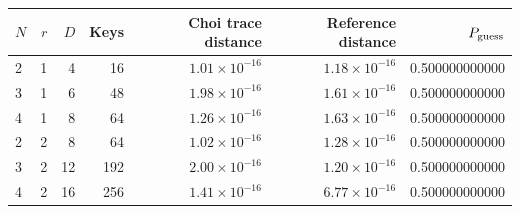 \begin{center}
{\footnotesize
\setlength{\tabcolsep}{4pt}
\begin{tabular}{@{}lrrrrrr@{}}
\toprule
$N$ & $r$ & $D$ & Keys & Choi trace distance & Reference distance & $P_{\rm guess}$ \\
\midrule
2 & 1 & 4 & 16 & $1.01\times10^{-16}$ & $1.18\times10^{-16}$ & 0.500000000000 \\
3 & 1 & 6 & 48 & $1.98\times10^{-16}$ & $1.61\times10^{-16}$ & 0.500000000000 \\
4 & 1 & 8 & 64 & $1.26\times10^{-16}$ & $1.63\times10^{-16}$ & 0.500000000000 \\
2 & 2 & 8 & 64 & $1.02\times10^{-16}$ & $1.28\times10^{-16}$ & 0.500000000000 \\
3 & 2 & 12 & 192 & $2.00\times10^{-16}$ & $1.20\times10^{-16}$ & 0.500000000000 \\
4 & 2 & 16 & 256 & $1.41\times10^{-16}$ & $6.77\times10^{-16}$ & 0.500000000000 \\
\bottomrule
\end{tabular}}
\end{center}
